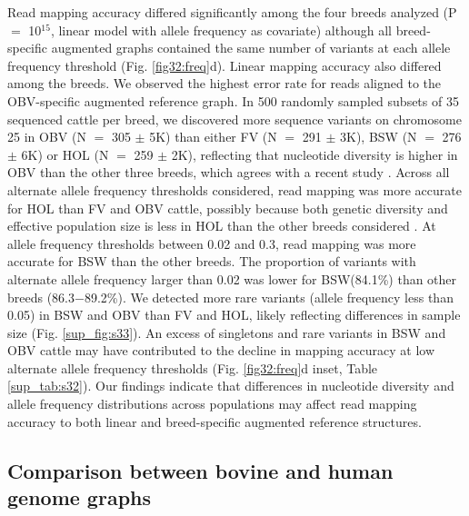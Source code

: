 \documentclass[../main.tex]{subfiles}
\begin{document}
Read mapping accuracy differed significantly among the four breeds analyzed (P $=$ 10$^{15}$, linear model with allele frequency as covariate) although all breed-specific augmented graphs contained the same number of variants at each allele frequency threshold (Fig. \ref{fig32:freq}d). Linear mapping accuracy also differed among the breeds. We observed the highest error rate for reads aligned to the OBV-specific augmented reference graph. In 500 randomly sampled subsets of 35 sequenced cattle per breed, we discovered more sequence variants on chromosome 25 in OBV (N $=$ 305 $\pm$ 5K) than either FV (N $=$ 291 $\pm$ 3K), BSW (N $=$ 276 $\pm$ 6K) or HOL (N $=$ 259 $\pm$ 2K), reflecting that nucleotide diversity is higher in OBV than the other three breeds, which agrees with a recent study \citep{bhati2020assessing}. Across all alternate allele frequency thresholds considered, read mapping was more accurate for HOL than FV and OBV cattle, possibly because both genetic diversity and effective population size is less in HOL than the other breeds considered \citep{signer2017population}. At allele frequency thresholds between 0.02 and 0.3, read mapping was more accurate for BSW than the other breeds. The proportion of variants with alternate allele frequency larger than 0.02 was lower for BSW(84.1\%) than other breeds (86.3$-$89.2\%). We detected more rare variants (allele frequency less than 0.05) in BSW and OBV than FV and HOL, likely reflecting differences in sample size (Fig. \ref{sup_fig:s33}). An excess of singletons and rare variants in BSW and OBV cattle may have contributed to the decline in mapping accuracy at low alternate allele frequency thresholds (Fig. \ref{fig32:freq}d inset, Table \ref{sup_tab:s32}). Our findings indicate that differences in nucleotide diversity and allele frequency distributions across populations may affect read mapping accuracy to both linear and breed-specific augmented reference structures.

\subsection*{Comparison between bovine and human genome graphs}
\end{document}
